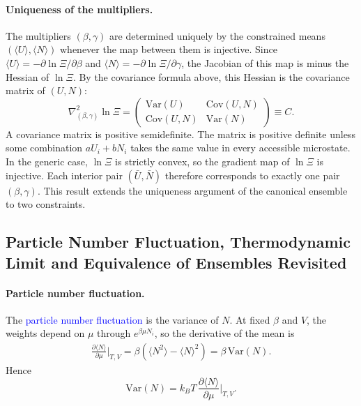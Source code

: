 \paragraph{Uniqueness of the multipliers.}
The multipliers $(\beta,\gamma)$ are determined uniquely by the constrained
means $(\langle U\rangle,\langle N\rangle)$ whenever the map between them is
injective. Since $\langle U\rangle=-\partial\ln\Xi/\partial\beta$ and
$\langle N\rangle=-\partial\ln\Xi/\partial\gamma$, the Jacobian of this map is
minus the Hessian of $\ln\Xi$. By the covariance formula above, this Hessian
is the covariance matrix of $(U,N)$:
\begin{equation}
    \boxed{\nabla^2_{(\beta,\gamma)}\ln\Xi
    =\begin{pmatrix}\mathrm{Var}(U)&\mathrm{Cov}(U,N)\\
    \mathrm{Cov}(U,N)&\mathrm{Var}(N)\end{pmatrix}\equiv C.}
\end{equation}
A covariance matrix is positive semidefinite. The matrix is positive definite
unless some combination $aU_i+bN_i$ takes the same value in every accessible
microstate. In the generic case, $\ln\Xi$ is strictly convex, so the
gradient map of $\ln\Xi$ is injective. Each interior pair $(\bar U,\bar N)$
therefore corresponds to exactly one pair $(\beta,\gamma)$. This result
extends the uniqueness argument of the canonical ensemble to two
constraints.

\subsection{Particle Number Fluctuation, Thermodynamic Limit and Equivalence of Ensembles Revisited}

\paragraph{Particle number fluctuation.}
The \textcolor{blue}{particle number fluctuation} is the variance of $N$. At
fixed $\beta$ and $V$, the weights depend on $\mu$ through $e^{\beta\mu N_i}$,
so the derivative of the mean is
\begin{align*}
    \frac{\partial\langle N\rangle}{\partial\mu}\bigg|_{T,V}
    =\beta\left(\langle N^2\rangle-\langle N\rangle^2\right)
    =\beta\,\mathrm{Var}(N).
\end{align*}
Hence
\begin{equation}
    \boxed{\mathrm{Var}(N)=k_BT\,\frac{\partial\langle N\rangle}{\partial\mu}\bigg|_{T,V}.}
\end{equation}

